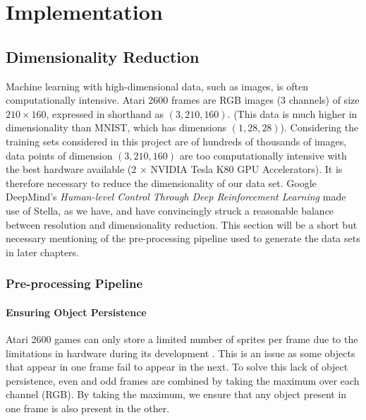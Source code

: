 \chapter{Implementation}

\label{ch:implementation}

%
%
%
%
%
\section{Dimensionality Reduction}

Machine learning with high-dimensional data, such as images, is often computationally intensive. Atari 2600 frames are RGB images ($3$ channels) of size $210 \times 160$, expressed in shorthand as $(3, 210, 160)$. (This data is much higher in dimensionality than MNIST, which has dimensions $(1, 28, 28)$). Considering the training sets considered in this project are of hundreds of thousands of images, data points of dimension $(3, 210, 160)$ are too computationally intensive with the best hardware available (2 $\times$ NVIDIA Tesla K80 GPU Accelerators). It is therefore necessary to reduce the dimensionality of our data set. Google DeepMind's \textit{Human-level Control Through Deep Reinforcement Learning} \cite{Mnih2015} made use of Stella, as we have, and have convincingly struck a reasonable balance between resolution and dimensionality reduction. This section will be a short but necessary mentioning of the pre-processing pipeline used to generate the data sets in later chapters.

\subsection{Pre-processing Pipeline}

\subsubsection{Ensuring Object Persistence}
Atari 2600 games can only store a limited number of sprites per frame due to the limitations in hardware during its development \cite{Mnih2015}. This is an issue as some objects that appear in one frame fail to appear in the next. To solve this lack of object persistence, even and odd frames are combined by taking the maximum over each channel (RGB). By taking the maximum, we ensure that any object present in one frame is also present in the other. 

